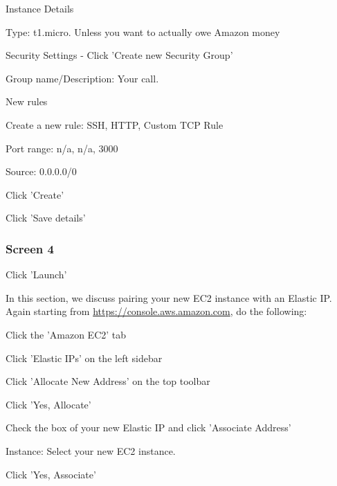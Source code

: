\documentclass{article}
\begin{document}
\begin{enumerate*}
\item Instance Details
\begin{enumerate*}
\item Type: t1.micro. Unless you want to actually owe Amazon money
\end{enumerate*}
\item Security Settings - Click 'Create new Security Group'
\begin{enumerate*}
\item Group name/Description: Your call.
\item New rules
\begin{enumerate*}
\item Create a new rule: SSH, HTTP, Custom TCP Rule
\item Port range: n/a, n/a, 3000
\item Source: 0.0.0.0/0
\end{enumerate*}
\item Click 'Create'
\end{enumerate*}
\item Click 'Save details'
\end{enumerate*}

\subsubsection*{Screen 4}

Click 'Launch'


In this section, we discuss pairing your new EC2 instance with an Elastic IP. Again starting from \href{https://console.aws.amazon.com}{https://console.aws.amazon.com}, do the following:

\begin{enumerate*}
\item Click the 'Amazon EC2' tab
\item Click 'Elastic IPs' on the left sidebar
\item Click 'Allocate New Address' on the top toolbar
\item Click 'Yes, Allocate'
\item Check the box of your new Elastic IP and click 'Associate Address'
\begin{enumerate*}
\item Instance: Select your new EC2 instance.
\item Click 'Yes, Associate'
\end{enumerate*}
\end{enumerate*}
\end{document}
